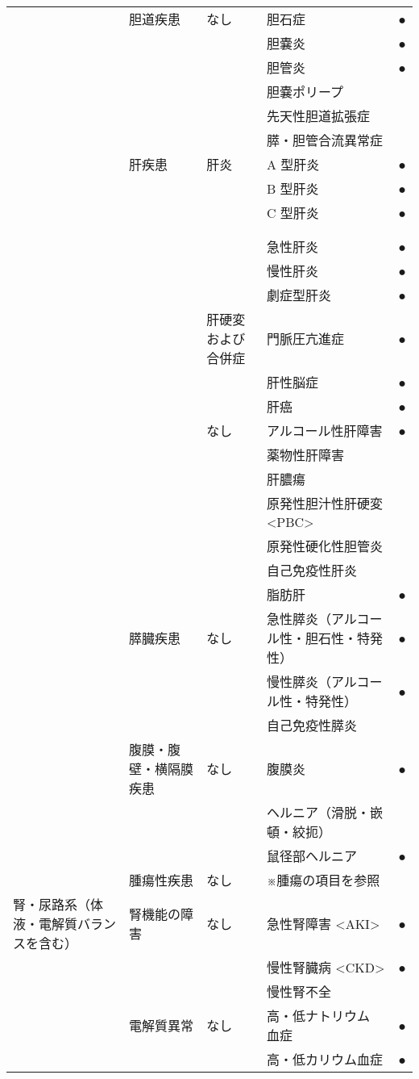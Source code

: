 \begin{xltabular}{\linewidth}{XXXXX}
 & 胆道疾患 & なし & 胆石症 & ● \\
 &  &  & 胆嚢炎 & ● \\
 &  &  & 胆管炎 & ● \\
 &  &  & 胆嚢ポリープ &  \\
 &  &  & 先天性胆道拡張症 &  \\
 &  &  & 膵・胆管合流異常症 &  \\
 & 肝疾患 & 肝炎 & A 型肝炎 & ● \\
 &  &  & B 型肝炎 & ● \\
 &  &  & C 型肝炎 & ● \\
 &  &  &  &  \\
 &  &  &  &  \\
 &  &  & 急性肝炎 & ● \\
 &  &  & 慢性肝炎 & ● \\
 &  &  & 劇症型肝炎 & ● \\
 &  & 肝硬変および合併症 & 門脈圧亢進症 & ● \\
 &  &  & 肝性脳症 & ● \\
 &  &  & 肝癌 & ● \\
 &  & なし & アルコール性肝障害 & ● \\
 &  &  & 薬物性肝障害 &  \\
 &  &  & 肝膿瘍 &  \\
 &  &  & 原発性胆汁性肝硬変<PBC> &  \\
 &  &  & 原発性硬化性胆管炎 &  \\
 &  &  & 自己免疫性肝炎 &  \\
 &  &  & 脂肪肝 & ● \\
 & 膵臓疾患 & なし & 急性膵炎（アルコール性・胆石性・特発性） & ● \\
 &  &  & 慢性膵炎（アルコール性・特発性） & ● \\
 &  &  & 自己免疫性膵炎 &  \\
 & 腹膜・腹壁・横隔膜疾患 & なし & 腹膜炎 & ● \\
 &  &  & ヘルニア（滑脱・嵌頓・絞扼） &  \\
 &  &  & 鼠径部ヘルニア & ● \\
 & 腫瘍性疾患 & なし & ※腫瘍の項目を参照 &  \\
腎・尿路系（体液・電解質バランスを含む） & 腎機能の障害 & なし & 急性腎障害 <AKI> & ● \\
 &  &  & 慢性腎臓病 <CKD> & ● \\
 &  &  & 慢性腎不全 &  \\
 & 電解質異常 & なし & 高・低ナトリウム 血症 & ● \\
 &  &  & 高・低カリウム血症 & ● \\

\end{xltabular}
